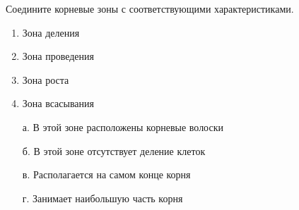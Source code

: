 
Соедините корневые зоны с соответствующими характеристиками.

        \begin{enumerate}
            \item Зона деления
            \item Зона проведения
            \item Зона роста
            \item Зона всасывания
        \end{enumerate}

        \begin{enumerate}
            \item[а.] В этой зоне расположены корневые волоски
            \item[б.] В этой зоне отсутствует деление клеток
            \item[в.] Располагается на самом конце корня
            \item[г.] Занимает наибольшую часть корня
        \end{enumerate}



